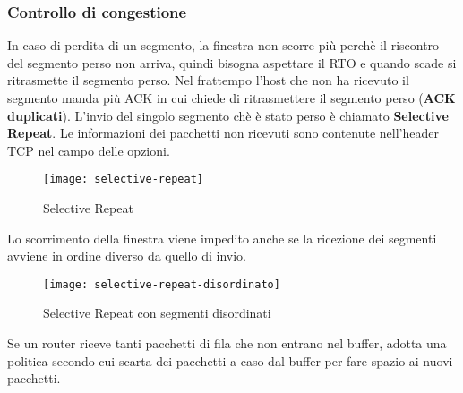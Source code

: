 \documentclass[a4paper]{article}
\begin{document}
\subsubsection{Controllo di congestione}
In caso di perdita di un segmento, la finestra non scorre più perchè il riscontro del
segmento perso non arriva, quindi bisogna aspettare il RTO e quando scade si ritrasmette
il segmento perso. Nel frattempo l'host che non ha ricevuto il segmento manda più ACK
in cui chiede di ritrasmettere il segmento perso (\textbf{ACK duplicati}). L'invio del singolo segmento chè
è stato perso è chiamato \textbf{Selective Repeat}. Le informazioni dei pacchetti non
ricevuti sono contenute nell'header TCP nel campo delle opzioni.
\begin{figure}[H]
  \centering
  \texttt{[image: selective-repeat]}
  \caption{Selective Repeat}
\end{figure}

\noindent
Lo scorrimento della finestra viene impedito anche se la ricezione dei segmenti avviene
in ordine diverso da quello di invio.
\begin{figure}[H]
  \centering
  \texttt{[image: selective-repeat-disordinato]}
  \caption{Selective Repeat con segmenti disordinati}
\end{figure}

\noindent
Se un router riceve tanti pacchetti di fila che non entrano nel buffer, adotta una
politica secondo cui scarta dei pacchetti a caso dal buffer per fare spazio ai nuovi 
pacchetti.
\end{document}
